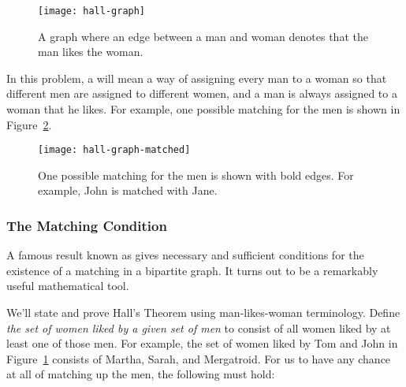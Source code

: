 \begin{figure}\redrawn


\texttt{[image: hall-graph]}

\caption{A graph where an edge between a man and woman denotes that
  the man likes the woman.}

\label{fig:5J}

\end{figure}

In this problem, a  will mean a way of assigning every
man to a woman so that different men are assigned to different women,
and a man is always assigned to a woman that he likes.  For example,
one possible matching for the men is shown in Figure~\ref{fig:5K}.

\begin{figure}\redrawn


\texttt{[image: hall-graph-matched]}

\caption{One possible matching for the men is shown with bold edges.
  For example, John is matched with Jane.}

\label{fig:5K}

\end{figure}

\subsubsection{The Matching Condition}

A famous result known as  gives necessary
and sufficient conditions for the existence of a matching in a
bipartite graph.  It turns out to be a remarkably useful mathematical
tool.

We'll state and prove Hall's Theorem using man-likes-woman
terminology.  Define \emph{the set of women liked by a given set of
  men} to consist of all women liked by at least one of those men.
For example, the set of women liked by Tom and John in
Figure~\ref{fig:5J} consists of Martha, Sarah, and Mergatroid.  For us
to have any chance at all of matching up the men, the following
 must hold:

\medskip

\noindent{}

